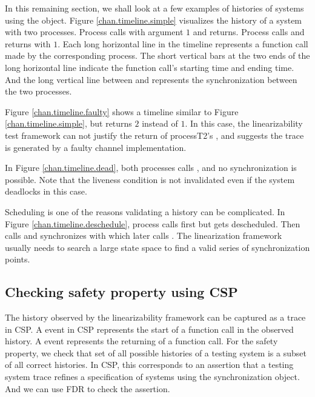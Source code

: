 \documentclass[a4paper, 12pt]{article}
\begin{document}
In this remaining section, we shall look at a few examples of histories of systems using the  object. Figure \ref{chan.timeline.simple} visualizes the history of a system with two processes. Process  calls  with argument $1$ and returns. Process  calls  and returns with $1$. Each long horizontal line in the timeline represents a function call made by the corresponding process. The short vertical bars at the two ends of the long horizontal line indicate the function call's starting time and ending time. And the long vertical line between  and  represents the synchronization between the two processes. 


Figure \ref{chan.timeline.faulty} shows a timeline similar to Figure \ref{chan.timeline.simple}, but  returns $2$ instead of $1$. In this case, the linearizability test framework can not justify the return of process{T2}'s , and suggests the trace is generated by a faulty channel implementation. 


In Figure \ref{chan.timeline.dead}, both processes calls , and no synchronization is possible. Note that the liveness condition is not invalidated even if the system deadlocks in this case.


Scheduling is one of the reasons validating a history can be complicated. In Figure \ref{chan.timeline.deschedule}, process  calls  first but gets descheduled. Then  calls  and synchronizes with  which later calls . The linearization framework usually needs to search a large state space to find a valid series of synchronization points. 


\subsection{Checking safety property using CSP} 
The history observed by the linearizability framework can be captured as a trace in CSP. A  event in CSP represents the start of a function call in the observed history. A  event represents the returning of a function call. For the safety property, we check that set of all possible histories of a testing system is a subset of all correct histories. In CSP, this corresponds to an assertion that a testing system trace refines a specification of systems using the synchronization object. And we can use FDR \cite{fdr} to check the assertion. 
\end{document}
